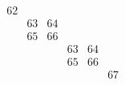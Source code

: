 \documentclass{amsart}
\begin{document}
\begin{align*}
\begin{array}{r||c|c|c}
\begin{array}{c|c|c|c|c}
 &  &  &  &  \\
 &  &  &  &  \\
 &  &  &  &  \\
 &  &  &  &  \\
\end{array}
&&
   \begin{array}{cccccc}
62 &  &  &  &  &  \\
 & 63 & 64 &  &  &  \\
 & 65 & 66 &  &  &  \\
 &  &  & 63 & 64 &  \\
 &  &  & 65 & 66 &  \\
 &  &  &  &  & 67 \\
   \end{array}
  \end{array}
\end{align*}
\end{document}
